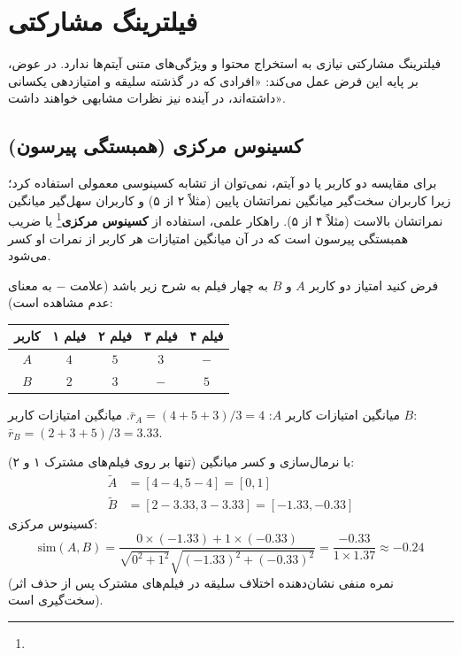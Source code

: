 \section{فیلترینگ مشارکتی \texorpdfstring{}{(Collaborative Filtering)}}
فیلترینگ مشارکتی نیازی به استخراج محتوا و ویژگی‌های متنی آیتم‌ها ندارد. در عوض، بر پایه این فرض عمل می‌کند: «افرادی که در گذشته سلیقه و امتیازدهی یکسانی داشته‌اند، در آینده نیز نظرات مشابهی خواهند داشت».

\subsection{کسینوس مرکزی (همبستگی پیرسون)}
برای مقایسه دو کاربر یا دو آیتم، نمی‌توان از تشابه کسینوسی معمولی استفاده کرد؛ زیرا کاربران سخت‌گیر میانگین نمراتشان پایین (مثلاً ۲ از ۵) و کاربران سهل‌گیر میانگین نمراتشان بالاست (مثلاً ۴ از ۵).
راهکار علمی، استفاده از \textbf{کسینوس مرکزی}\footnote{} یا ضریب همبستگی پیرسون است که در آن میانگین امتیازات هر کاربر از نمرات او کسر می‌شود.

\begin{example}
فرض کنید امتیاز دو کاربر $A$ و $B$ به چهار فیلم به شرح زیر باشد (علامت $-$ به معنای عدم مشاهده است):
\begin{center}
\begin{tabular}{ccccc}
\toprule
کاربر & فیلم ۱ & فیلم ۲ & فیلم ۳ & فیلم ۴ \\
\midrule
$A$ & $4$ & $5$ & $3$ & $-$ \\
$B$ & $2$ & $3$ & $-$ & $5$ \\
\bottomrule
\end{tabular}
\end{center}
میانگین امتیازات کاربر $A$: $\bar{r}_A = (4 + 5 + 3)/3 = 4$.
میانگین امتیازات کاربر $B$: $\bar{r}_B = (2 + 3 + 5)/3 = 3.33$.

با نرمال‌سازی و کسر میانگین (تنها بر روی فیلم‌های مشترک ۱ و ۲):
\begin{align}
\tilde{A} &= [4-4, 5-4] = [0, 1] \\
\tilde{B} &= [2-3.33, 3-3.33] = [-1.33, -0.33]
\end{align}
کسینوس مرکزی:
\begin{equation}
\text{sim}(A, B) = \frac{0 \times (-1.33) + 1 \times (-0.33)}{\sqrt{0^2 + 1^2} \sqrt{(-1.33)^2 + (-0.33)^2}} = \frac{-0.33}{1 \times 1.37} \approx -0.24
\end{equation}
(نمره منفی نشان‌دهنده اختلاف سلیقه در فیلم‌های مشترک پس از حذف اثر سخت‌گیری است).
\end{example}

